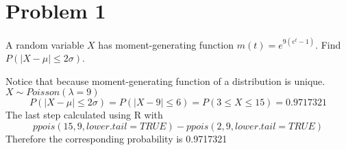 \documentclass[11pt]{article}
\begin{document}
\section*{Problem 1}
A random variable $X$ has moment-generating function $m(t)=e^{9(e^t - 1)}$. Find $P(|X - \mu|\leq 2\sigma)$.
\begin{solution}
  $ $\\
  Notice that because moment-generating function of a distribution is unique. $X \sim Poisson(\lambda = 9)$
  \[
    P(|X - \mu|\leq 2\sigma) = P(|X - 9| \leq 6) = P(3\leq X \leq 15) = 0.9717321
  \]
  The last step calculated using R with
  \[
    ppois(15, 9, lower.tail = TRUE) - ppois(2, 9, lower.tail = TRUE)
  \]
  Therefore the corresponding probability is 0.9717321
\end{solution}


\newpage
\end{document}
